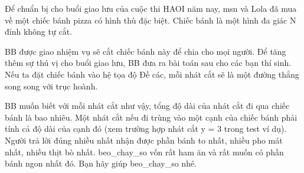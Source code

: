 Để chuẩn bị cho buổi giao lưu của cuộc thi HAOI năm nay, msn và Lola đã mua về một chiếc bánh pizza có hình thù đặc biệt. Chiếc bánh là một hình đa giác N đỉnh không tự cắt.  

   BB được giao nhiệm vụ sẽ cắt chiếc bánh này để chia cho mọi người. Để tăng thêm sự thú vị cho buổi giao lưu, BB đưa ra bài toán sau cho các bạn thí sinh. Nếu ta đặt chiếc bánh vào hệ tọa độ Đề các, mỗi nhát cắt sẽ là một đường thẳng song song với trục hoành.  

   BB muốn biết với mỗi nhát cắt như vậy, tổng độ dài của nhát cắt đi qua chiếc bánh là bao nhiêu. Một nhát cắt nếu đi trùng vào một cạnh của chiếc bánh phải tính cả độ dài của cạnh đó (xem trường hợp nhát cắt y = 3 trong test ví dụ). Người trả lời đúng nhiều nhất nhận được phần bánh to nhất, nhiều pho mát nhất, nhiều thịt bò nhất. beo\_chay\_so vốn rất ham ăn và rất muốn có phần bánh ngon nhất đó. Bạn hãy giúp beo\_chay\_so nhé.